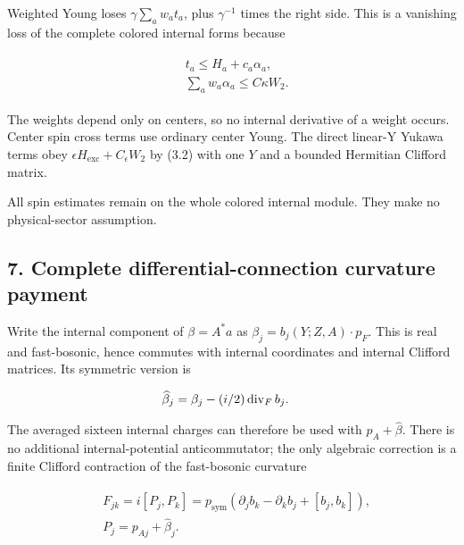 Weighted Young loses \(\gamma  \sum _{a} w_{a} t_{a}\), plus
\(\gamma ^{-1}\) times the right side. This is a vanishing loss of the
complete colored internal forms because

\begin{gather*}
\begin{aligned}
& t_{a}\le H_{a}+c_{a} \alpha _{a}, \\
& \sum _{a} w_{a} \alpha _{a}\le C \kappa  W_{2}.
\end{aligned}\tag{6.4}
\end{gather*}

The weights depend only on centers, so no internal derivative of a
weight occurs. Center spin cross terms use ordinary center Young. The
direct linear-Y Yukawa terms obey
\(\epsilon  H_{\mathrm{exc}}+C_{\epsilon} W_{2}\) by (3.2) with one
\(Y\) and a bounded Hermitian Clifford matrix.

All spin estimates remain on the whole colored internal module. They
make no physical-sector assumption.

\subsection{7. Complete differential-connection curvature
payment}\label{h-complete-differential-connection-curvature-payment}

Write the internal component of \(\beta  =A^{*}a\) as
\(\beta _{j}=b_{j}(Y;Z,A) \cdot  p_{F}\). This is real and fast-bosonic,
hence commutes with internal coordinates and internal Clifford matrices.
Its symmetric version is

\begin{gather*}
\begin{aligned}
& \widehat{\beta}_{j}= \beta _{j}-(i/2)\operatorname{div} _{F} b_{j}.
\end{aligned}\notag
\end{gather*}

The averaged sixteen internal charges can therefore be used with
\(p_{A}+ \widehat{\beta}\). There is no additional internal-potential
anticommutator; the only algebraic correction is a finite Clifford
contraction of the fast-bosonic curvature

\begin{gather*}
\begin{aligned}
& F_{jk}=i[P_{j},P_{k}]=p_{\mathrm{sym}}( \partial  _{j} b_{k}- \partial  _{k} b_{j}+[b_{j},b_{k}]), \\
& P_{j}=p_{Aj}+ \widehat{\beta}_{j}.
\end{aligned}\tag{7.1}
\end{gather*}


